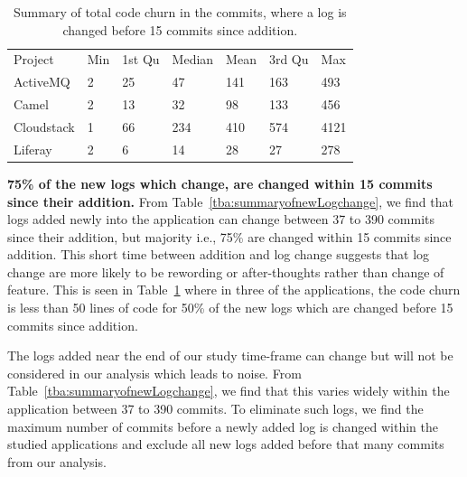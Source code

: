 \begin{table}[t]
	\centering
	\caption{Summary of total code churn in the commits, where a log is changed before 15 commits since addition.}
	
	\begin{tabular}{lllllll}
		\cline{1-7}
		Project    & Min & 1st Qu & Median & Mean & 3rd Qu & Max \\
		\cline{1-7}
		ActiveMQ   & 2  & 25      & 47     & 141    & 163     & 493  \\
		Camel      & 2   & 13      & 32      & 98    & 133      & 456 \\
		Cloudstack & 1   & 66      & 234      & 410   & 574     & 4121 \\
		Liferay    & 2   & 6      & 14     & 28    & 27     & 278\\	\cline{1-7}
		
	\end{tabular}
	\label{tba:summaryofnewLogCodechange}
\end{table}




\textbf{75\% of the new logs which change, are changed within 15 commits since their addition.} From Table~\ref{tba:summaryofnewLogchange}, we find that logs added newly into the application can change between 37 to 390 commits since their addition, but majority i.e., 75\% are changed within 15 commits since addition. This short time between addition and log change suggests that log change are more likely to be rewording or after-thoughts rather than change of feature.  This is seen in Table~\ref{tba:summaryofnewLogCodechange} where in three of the applications, the code churn is less than 50 lines of code for 50\% of the new logs which are changed before 15 commits since addition. 

The logs added near the end of our study time-frame can change but will not be considered in our analysis which leads to noise. From Table~\ref{tba:summaryofnewLogchange}, we find that this varies widely within the application between 37 to 390 commits. To eliminate such logs, we find the maximum number of commits before a newly added log is changed within the studied applications and exclude all new logs added before that many commits from our analysis.  





